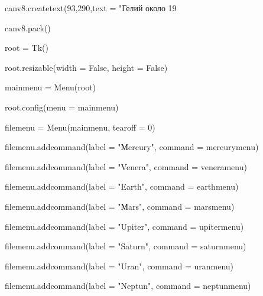 \documentclass[14pt, oneside]{SavkinSeliverstov}
\begin{document}
	canv\underline{\hspace{0.2cm}}8.create\underline{\hspace{0.2cm}}text(93,290,text = "Гелий около 19%
	
	canv\underline{\hspace{0.2cm}}8.pack()



root = Tk()

root.resizable(width = False, height = False)

mainmenu = Menu(root)

root.config(menu = mainmenu)


filemenu = Menu(mainmenu, tearoff = 0)

filemenu.add\underline{\hspace{0.2cm}}command(label = "Мercury", command = mercury\underline{\hspace{0.2cm}}menu)

filemenu.add\underline{\hspace{0.2cm}}command(label = "Venera", command = venera\underline{\hspace{0.2cm}}menu)

filemenu.add\underline{\hspace{0.2cm}}command(label = "Earth", command = earth\underline{\hspace{0.2cm}}menu)

filemenu.add\underline{\hspace{0.2cm}}command(label = "Мars", command = mars\underline{\hspace{0.2cm}}menu)

filemenu.add\underline{\hspace{0.2cm}}command(label = "Upiter", command = upiter\underline{\hspace{0.2cm}}menu)

filemenu.add\underline{\hspace{0.2cm}}command(label = "Saturn", command = saturn\underline{\hspace{0.2cm}}menu)

filemenu.add\underline{\hspace{0.2cm}}command(label = "Uran", command = uran\underline{\hspace{0.2cm}}menu)

filemenu.add\underline{\hspace{0.2cm}}command(label = "Neptun", command = neptun\underline{\hspace{0.2cm}}menu)
\end{document}
